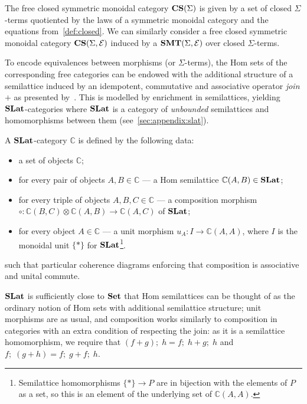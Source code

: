 \begin{definition}
	The free closed symmetric monoidal category $\mathbf{CS}(\Sigma)$ is given by a set of closed $\Sigma$-terms quotiented by the laws of a symmetric monoidal category and the equations from~\autoref{def:closed}.
	We can similarly consider a free closed symmetric monoidal category $\mathbf{CS}(\Sigma, \mathcal{E})$ induced by a $\mathbf{SMT}(\Sigma, \mathcal{E})$ over closed $\Sigma$-terms.
\end{definition}

To encode equivalences between morphisms (or $\Sigma$-terms), the Hom sets of the corresponding free categories can be endowed with the additional structure of a semilattice induced by an idempotent, commutative and associative operator \textit{join} $+$ as presented by~\citet{tiurin2025equivalencehypergraphsdporewriting}.
This is modelled by enrichment in semilattices, yielding $\mathbf{SLat}$-categories where $\mathbf{SLat}$ is a category of \textit{unbounded} semilattices and homomorphisms between them (see~\autoref{sec:appendix:slat}).

\begin{definition}%
	\label{def:slat-cat}
	A $\mathbf{SLat}$-category $\mathbb{C}$ is defined by the following data:
	\begin{itemize}
		\item a set of objects $\mathbb{C}$;
		\item for every pair of objects $A,B \in \mathbb{C}$ --- a Hom semilattice $\mathbb{C}(A,B) \in \mathbf{SLat}$;
		\item for every triple of objects $A,B,C \in \mathbb{C}$ --- a composition morphism
		      $\circ\colon \mathbb{C}(B,C) \otimes \mathbb{C}(A,B) \to \mathbb{C}(A,C)$ of $\mathbf{SLat}$;
		\item for every object $A \in \mathbb{C}$ --- a unit morphism
		      $u_{A}\colon I \to \mathbb{C}(A,A)$, where $I$ is the monoidal unit $\{*\}$ for $\mathbf{SLat}$\footnote{Semilattice homomorphisms $\{*\} \to P$ are in bijection with the elements of $P$ as a set, so this is an element of the underlying set of $\mathbb{C}(A,A)$.}.
	\end{itemize}
	such that particular coherence diagrams enforcing that composition is associative and unital commute.
\end{definition}
$\mathbf{SLat}$ is sufficiently close to $\mathbf{Set}$ that Hom semilattices can be thought of as the ordinary notion of Hom sets with additional semilattice structure; unit morphisms are as usual, and composition works similarly to composition in categories with an extra condition of respecting the join: as it is a semilattice homomorphism, we require that $(f + g);\; h = f;\;h + g;\;h$ and $f;\;(g+h) = f;\;g + f;\;h$.

